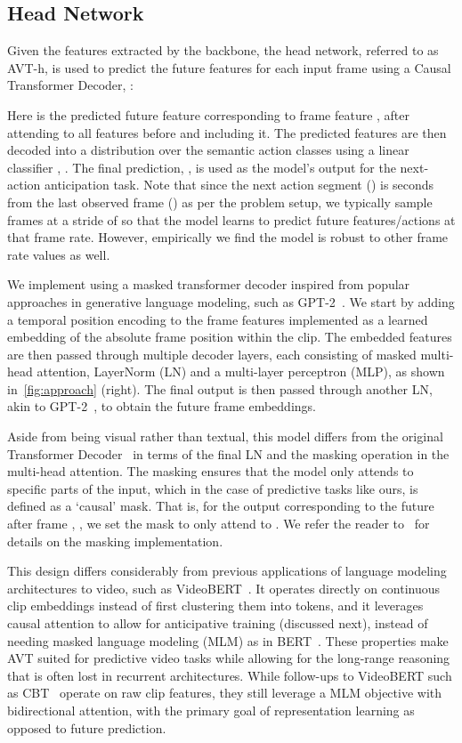 \documentclass[10pt,twocolumn,letterpaper]{article}
\newcommand{\method}{AVT\xspace}
\newcommand{\txHead}{\method{}-h\xspace}
\newcommand{\lossBoth}{anticipative\xspace}
\begin{document}
\subsection{Head Network}

Given the features extracted by the backbone, the head network, referred to as \txHead, is used to predict the future features for each input frame using a Causal Transformer Decoder, : 

Here  is the predicted future feature corresponding to frame feature , after attending to all features before and including it.
The predicted features are then decoded into a distribution over the semantic action classes using a linear classifier , \ie . The final prediction, , is used as the model's output for the next-action anticipation task.  
Note that since the next action segment () is  seconds from the last observed frame () as per the problem setup, we typically sample frames at a stride of  so that the model learns to predict future features/actions at that frame rate. However, empirically we find the model is robust to other frame rate values as well.


We implement   using a masked transformer decoder inspired from popular approaches in generative language modeling, such as GPT-2~\cite{radford2019language}.
We start by adding a temporal position encoding to the frame features implemented as a learned embedding of the absolute frame position within the clip. The embedded features are then passed through multiple decoder layers, 
each consisting of masked multi-head attention, LayerNorm (LN) and a multi-layer perceptron (MLP), as shown in~\cref{fig:approach} (right).
The final output is then passed through another LN, akin to GPT-2~\cite{radford2019language}, to obtain the future frame embeddings.  


Aside from being visual rather than textual, this model differs from the original Transformer Decoder~\cite{vaswani2017attention} in terms of the final LN and the masking operation in the multi-head attention. The masking ensures that the model only attends to specific parts of the input, which in the case of
predictive tasks like ours, is defined as a `causal' mask. That is, for the output corresponding to the future after frame , \ie , we set the mask to only attend to . 
We refer the reader to~\cite{radford2019language} for details on the masking implementation.


This design differs considerably from previous applications of language modeling architectures to video, such as VideoBERT~\cite{sun2019videobert}. It operates directly on continuous clip embeddings instead of first clustering them into tokens, and it leverages causal attention to allow for \lossBoth training (discussed next), instead of needing masked language modeling (MLM) as in BERT~\cite{devlin2019bert}. 
These properties make \method suited for predictive video tasks while allowing for the long-range reasoning that is often lost in recurrent architectures.
While follow-ups to VideoBERT such as CBT~\cite{sun2019contrastive} operate on raw clip features, they still leverage a MLM objective with bidirectional attention, with the primary goal of representation learning as opposed to future prediction.
\end{document}
